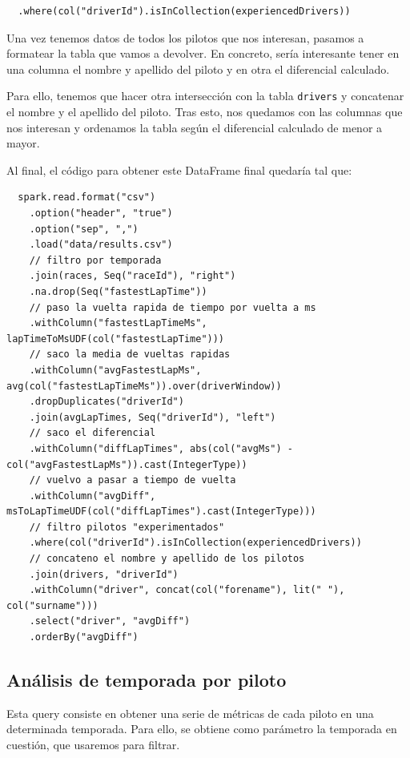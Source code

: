 \documentclass[12pt,twoside,titlepage]{report}
\begin{document}
\begin{lstlisting}
  .where(col("driverId").isInCollection(experiencedDrivers))
\end{lstlisting}

Una vez tenemos datos de todos los pilotos que nos interesan, pasamos a formatear la tabla que vamos a devolver. En concreto, sería interesante tener en una columna el nombre y apellido del piloto y en otra el diferencial calculado.

Para ello, tenemos que hacer otra intersección con la tabla \texttt{drivers} y concatenar el nombre y el apellido del piloto. Tras esto, nos quedamos con las columnas que nos interesan y ordenamos la tabla según el diferencial calculado de menor a mayor.

Al final, el código para obtener este DataFrame final quedaría tal que:

\vfil \break

\begin{lstlisting}
  spark.read.format("csv")
    .option("header", "true")
    .option("sep", ",")
    .load("data/results.csv")
    // filtro por temporada
    .join(races, Seq("raceId"), "right")
    .na.drop(Seq("fastestLapTime"))
    // paso la vuelta rapida de tiempo por vuelta a ms
    .withColumn("fastestLapTimeMs", lapTimeToMsUDF(col("fastestLapTime")))
    // saco la media de vueltas rapidas
    .withColumn("avgFastestLapMs", avg(col("fastestLapTimeMs")).over(driverWindow))
    .dropDuplicates("driverId")
    .join(avgLapTimes, Seq("driverId"), "left")
    // saco el diferencial
    .withColumn("diffLapTimes", abs(col("avgMs") - col("avgFastestLapMs")).cast(IntegerType))
    // vuelvo a pasar a tiempo de vuelta
    .withColumn("avgDiff", msToLapTimeUDF(col("diffLapTimes").cast(IntegerType)))
    // filtro pilotos "experimentados"
    .where(col("driverId").isInCollection(experiencedDrivers))
    // concateno el nombre y apellido de los pilotos
    .join(drivers, "driverId")
    .withColumn("driver", concat(col("forename"), lit(" "), col("surname")))
    .select("driver", "avgDiff")
    .orderBy("avgDiff")
\end{lstlisting}

\newpage


\subsection{Análisis de temporada por piloto} \label{analisistemporada}

Esta query consiste en obtener una serie de métricas de cada piloto en una determinada temporada. Para ello, se obtiene como parámetro la temporada en cuestión, que usaremos para filtrar.
\end{document}

